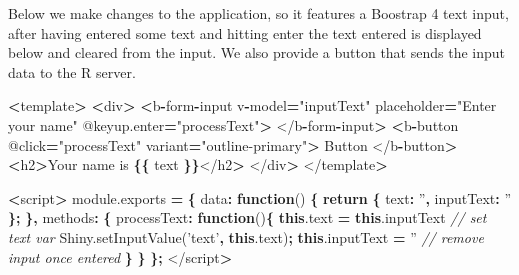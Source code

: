 \documentclass[10pt,]{krantz}
\makeatletter
\newenvironment{Shaded}{\begin{snugshade}}{\end{snugshade}}
\newcommand{\AttributeTok}[1]{\textcolor[rgb]{0.61,0.61,0.61}{#1}}
\newcommand{\CommentTok}[1]{\textcolor[rgb]{0.37,0.37,0.37}{\textit{#1}}}
\newcommand{\ControlFlowTok}[1]{\textcolor[rgb]{0.27,0.27,0.27}{\textbf{#1}}}
\newcommand{\DataTypeTok}[1]{\textcolor[rgb]{0.27,0.27,0.27}{#1}}
\newcommand{\KeywordTok}[1]{\textcolor[rgb]{0.27,0.27,0.27}{\textbf{#1}}}
\newcommand{\NormalTok}[1]{#1}
\newcommand{\OperatorTok}[1]{\textcolor[rgb]{0.43,0.43,0.43}{\textbf{#1}}}
\newcommand{\StringTok}[1]{\textcolor[rgb]{0.5,0.5,0.5}{#1}}
\newcommand{\VariableTok}[1]{\textcolor[rgb]{0,0,0}{#1}}
\newenvironment{kframe}{%
\medskip{}
\setlength{\fboxsep}{.8em}
 \def\at@end@of@kframe{}%
 \ifinner\ifhmode%
  \def\at@end@of@kframe{\end{minipage}}%
  \begin{minipage}{\columnwidth}%
 \fi\fi%
 \def\FrameCommand##1{\hskip\@totalleftmargin \hskip-\fboxsep
 \colorbox{shadecolor}{##1}\hskip-\fboxsep
     \hskip-\linewidth \hskip-\@totalleftmargin \hskip\columnwidth}%
 \MakeFramed {\advance\hsize-\width
   \@totalleftmargin\z@ \linewidth\hsize
   \@setminipage}}%
 {\par\unskip\endMakeFramed%
 \at@end@of@kframe}
\renewenvironment{Shaded}{\begin{kframe}}{\end{kframe}}
\makeatother
\begin{document}
Below we make changes to the application, so it features a Boostrap 4 text input, after having entered some text and hitting enter the text entered is displayed below and cleared from the input. We also provide a button that sends the input data to the R server.

\begin{Shaded}
\begin{Highlighting}[]
\OperatorTok{<}\NormalTok{template}\OperatorTok{>}
  \OperatorTok{<}\NormalTok{div}\OperatorTok{>}
    \OperatorTok{<}\NormalTok{b}\OperatorTok{-}\NormalTok{form}\OperatorTok{-}\NormalTok{input }
\NormalTok{      v}\OperatorTok{-}\NormalTok{model}\OperatorTok{=}\StringTok{"inputText"} 
\NormalTok{      placeholder}\OperatorTok{=}\StringTok{"Enter your name"} 
\NormalTok{      @}\VariableTok{keyup}\NormalTok{.}\AttributeTok{enter}\OperatorTok{=}\StringTok{"processText"}\OperatorTok{>}
\NormalTok{    </b}\OperatorTok{-}\NormalTok{form}\OperatorTok{-}\NormalTok{input}\OperatorTok{>}
    \OperatorTok{<}\NormalTok{b}\OperatorTok{-}\NormalTok{button }
\NormalTok{      @click}\OperatorTok{=}\StringTok{"processText"} 
\NormalTok{      variant}\OperatorTok{=}\StringTok{"outline-primary"}\OperatorTok{>}
\NormalTok{      Button}
\NormalTok{    </b}\OperatorTok{-}\NormalTok{button}\OperatorTok{>}
    \OperatorTok{<}\NormalTok{h2}\OperatorTok{>}\NormalTok{Your name is }\OperatorTok{\{\{}\NormalTok{ text }\OperatorTok{\}\}}\NormalTok{</h2}\OperatorTok{>}
\NormalTok{  </div}\OperatorTok{>}
\NormalTok{</template}\OperatorTok{>}

\OperatorTok{<}\NormalTok{script}\OperatorTok{>}
\VariableTok{module}\NormalTok{.}\AttributeTok{exports} \OperatorTok{=} \OperatorTok{\{}
  \DataTypeTok{data}\OperatorTok{:} \KeywordTok{function}\NormalTok{() }\OperatorTok{\{}
    \ControlFlowTok{return} \OperatorTok{\{}
      \DataTypeTok{text}\OperatorTok{:} \StringTok{''}\OperatorTok{,}
      \DataTypeTok{inputText}\OperatorTok{:} \StringTok{''}
    \OperatorTok{\};}
  \OperatorTok{\},}
  \DataTypeTok{methods}\OperatorTok{:} \OperatorTok{\{}
    \DataTypeTok{processText}\OperatorTok{:} \KeywordTok{function}\NormalTok{()}\OperatorTok{\{}
      \KeywordTok{this}\NormalTok{.}\AttributeTok{text} \OperatorTok{=} \KeywordTok{this}\NormalTok{.}\AttributeTok{inputText} \CommentTok{// set text var}
      \VariableTok{Shiny}\NormalTok{.}\AttributeTok{setInputValue}\NormalTok{(}\StringTok{'text'}\OperatorTok{,} \KeywordTok{this}\NormalTok{.}\AttributeTok{text}\NormalTok{)}\OperatorTok{;}
      \KeywordTok{this}\NormalTok{.}\AttributeTok{inputText} \OperatorTok{=} \StringTok{''} \CommentTok{// remove input once entered}
    \OperatorTok{\}}
  \OperatorTok{\}}
\OperatorTok{\};}
\NormalTok{</script}\OperatorTok{>}
\end{Highlighting}
\end{Shaded}
\end{document}
